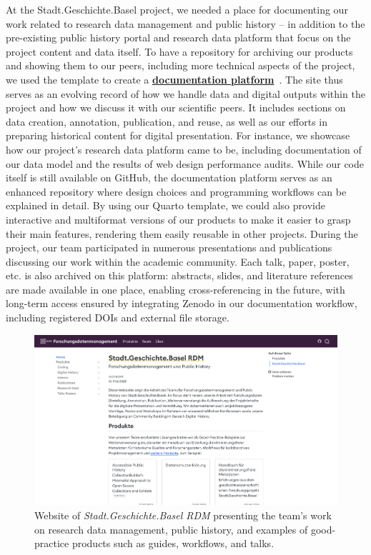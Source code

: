 \documentclass[final]{anthology-ch} %
\begin{document}
At the Stadt.Geschichte.Basel project, we needed a place for documenting our work related to research data management and public history -- in addition to the pre-existing public history portal and research data platform that focus on the project content and data itself. To have a repository for archiving our products and showing them to our peers, including more technical aspects of the project, we used the template to create a \href{https://dokumentation.stadtgeschichtebasel.ch}{\textbf{documentation platform}}~\cite{maehr2024g}. The site thus serves as an evolving record of how we handle data and digital outputs within the project and how we discuss it with our scientific peers. It includes sections on data creation, annotation, publication, and reuse, as well as our efforts in preparing historical content for digital presentation. For instance, we showcase how our project's research data platform came to be, including documentation of our data model and the results of web design performance audits. While our code itself is still available on GitHub, the documentation platform serves as an enhanced repository where design choices and programming workflows can be explained in detail. By using our Quarto template, we could also provide interactive and multiformat versions of our products to make it easier to grasp their main features, rendering them easily reusable in other projects. During the project, our team participated in numerous presentations and publications discussing our work within the academic community. Each talk, paper, poster, etc. is also archived on this platform: abstracts, slides, and literature references are made available in one place, enabling cross-referencing in the future, with long-term access ensured by integrating Zenodo in our documentation workflow, including registered DOIs and external file storage.

\begin{figure}[t!]
  \centering
  \includegraphics[width=0.9\linewidth]{images/dokumentation_stadtgeschichtebasel_ch.png}
  \caption{Website of \emph{Stadt.Geschichte.Basel RDM} presenting the team's work on research data management, public history, and examples of good-practice products such as guides, workflows, and talks.}
  \label{fig-sgb-rdm}
\end{figure}
\end{document}
